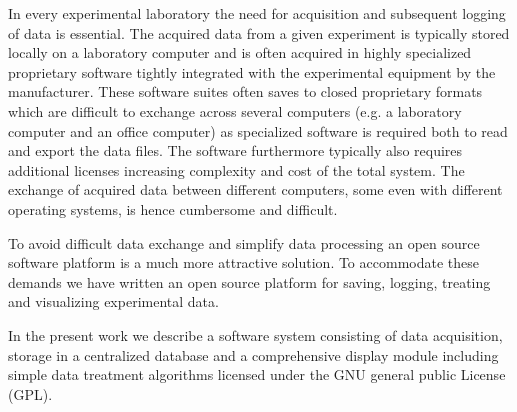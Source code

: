 In every experimental laboratory the need for acquisition and subsequent
logging of data is essential. The acquired data from a given experiment is
typically stored locally on a laboratory computer and is often acquired in
highly specialized proprietary software tightly integrated with the
experimental equipment by the manufacturer. These software suites often saves
to closed proprietary formats which are difficult to exchange across several
computers (e.g. a laboratory computer and an office computer) as specialized
software is required both to read and export the data files. The software
furthermore typically also requires additional licenses increasing complexity
and cost of the total system. The exchange of acquired data between different
computers, some even with different operating systems, is hence cumbersome and
difficult.

To avoid difficult data exchange and simplify data processing an open source
software platform is a much more attractive
solution\cite{Benn2009,Murray2011,So2007}. To accommodate these demands we have
written an open source platform for saving, logging, treating and visualizing
experimental data.

In the present work we describe a software system consisting of data
acquisition, storage in a centralized database and a comprehensive display
module including simple data treatment algorithms licensed under the GNU
general public License (GPL)\cite{gpl}.
